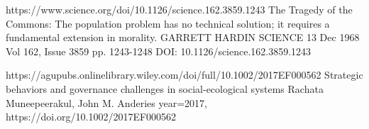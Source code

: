 https://www.science.org/doi/10.1126/science.162.3859.1243
The Tragedy of the Commons: The population problem has no technical solution; it requires a fundamental extension in morality.
GARRETT HARDIN
SCIENCE
13 Dec 1968
Vol 162, Issue 3859
pp. 1243-1248
DOI: 10.1126/science.162.3859.1243




https://agupubs.onlinelibrary.wiley.com/doi/full/10.1002/2017EF000562
Strategic behaviors and governance challenges in social-ecological systems
Rachata Muneepeerakul, John M. Anderies
year={2017},
https://doi.org/10.1002/2017EF000562